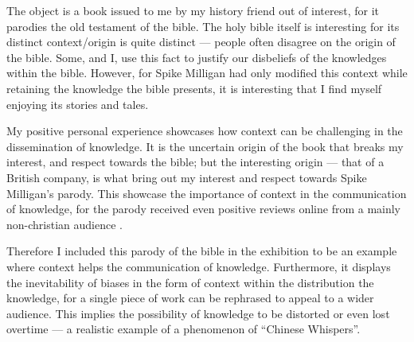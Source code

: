 \documentclass[a4paper,11pt]{article}
\begin{document}
The object is a book issued to me by my history friend out of interest, for it parodies the old testament of the bible. The holy bible itself is interesting for its distinct context/origin is quite distinct --- people often disagree on the origin of the bible. Some, and I, use this fact to justify our disbeliefs of the knowledges within the bible. However, for Spike Milligan had only modified this context while retaining the knowledge the bible presents, it is interesting that I find myself enjoying its stories and tales.

My positive personal experience showcases how context can be challenging in the dissemination of knowledge. It is the uncertain origin of the book that breaks my interest, and respect towards the bible; but the interesting origin --- that of a British company, is what bring out my interest and respect towards Spike Milligan's parody. This showcase the importance of context in the communication of knowledge, for the parody received even positive reviews online from a mainly non-christian audience \parencite{Review}.




Therefore I included this parody of the bible in the exhibition to be an example where context helps the communication of knowledge. Furthermore, it displays the inevitability of biases in the form of context within the distribution the knowledge, for a single piece of work can be rephrased to appeal to a wider audience. This implies the possibility of knowledge to be distorted or even lost overtime --- a realistic example of a phenomenon of ``Chinese Whispers''.
\end{document}
